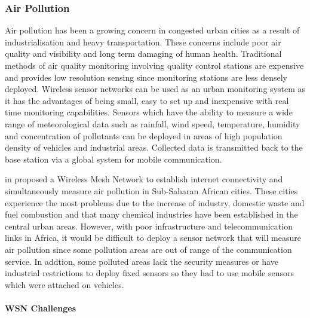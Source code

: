 \subsubsection*{Air Pollution}
\cite{libeliumAirPollution}
\cite{wsnpollution} 

\cite{fotuewsnpollution}

Air pollution has been a growing concern in congested urban cities as a result of industrialisation and heavy transportation. These concerns include poor air quality and visibility and long term damaging of human health. Traditional methods of air quality monitoring involving quality control stations are expensive and provides low resolution sensing since monitoring stations are less densely deployed. Wireless sensor networks can be used as an urban monitoring system as it has the advantages of being small, easy to set up and inexpensive with real time monitoring capabilities. Sensors which have the ability to measure a wide range of meteorological data such as rainfall, wind speed, temperature, humidity and concentration of pollutants can be deployed in areas of high population density of vehicles and industrial areas. Collected data is transmitted back to the base station via a global system for mobile communication.

\citeauthor{fotuewsnpollution} in \cite{fotuewsnpollution} proposed a Wireless Mesh Network to establish internet connectivity and simultaneously measure air pollution in Sub-Saharan African cities. These cities experience the most problems due to the increase of industry, domestic waste and fuel combustion and that many chemical industries have been established in the central urban areas. However, with poor infrastructure and telecommunication links in Africa, it would be difficult to deploy a sensor network that will measure air pollution since some pollution areas are out of range of the communication service. In addtion, some polluted areas lack the security measures or have industrial restrictions to deploy fixed sensors so they had to use mobile sensors which were attached on vehicles. 

\paragraph{WSN Challenges}

